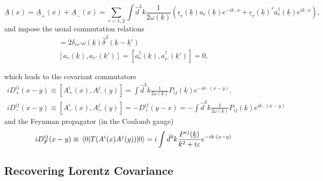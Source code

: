 \documentclass{article}
\numberwithin{equation}{section}
\begin{document}
\begin{equation}
    \underline{A}(x) = \underline{A}_+(x) + \underline{A}_-(x) = \sum_{r=1,2} \int \hat{d}^3k \frac{1}{2\omega(\underline{k})} \left(\underline{\epsilon}_r(\underline{k}) a_r(\underline{k}) e^{-ik\cdot x} + \underline{\epsilon}_r(\underline{k})^* a_r^\dagger(\underline{k})e^{ik\cdot x}\right), 
\end{equation}
and impose the usual commutation relations
\begin{gather}
    [a_r(\underline{k}), a_{r'}^\dagger(\underline{k}')] = 2\delta_{rr'} \omega(\underline{k}) \hat{\delta}^3(\underline{k} - \underline{k}') \\
    [a_r(\underline{k}), a_{r'}(\underline{k}')] = [a_r^\dagger(\underline{k}), a_{r'}^\dagger(\underline{k}')] = 0,
\end{gather}

which leads to the covariant commutators
\begin{gather}
    iD_+^{ij}(x-y) \equiv [A_+^i(x), A_-^j(y)] = \int \hat{d}^3k \frac{1}{2\omega(\underline{k})} P_{ij}(\underline{k})e^{-ik\cdot (x-y)}, \\
    iD_-^{ij}(x-y) \equiv [A_-^i(x), A_+^j(y)] = - D_+^{ij}(y-x) = -\int \hat{d}^3k \frac{1}{2\omega(\underline{k})} P_{ij}(\underline{k})e^{ik\cdot (x-y)}
\end{gather}
and the Feynman propagator (in the Coulomb gauge)
\begin{equation}
    i D_F^{ij}(x-y) \equiv  \ev{T(A^i(x)A^j(y))}{0} = i \int \hat{d}^4k \frac{P^{ij}(\underline{k})}{k^2+i\varepsilon} e^{-ik \cdot (x-y)}
\end{equation}

\subsection{Recovering Lorentz Covariance}
\end{document}
